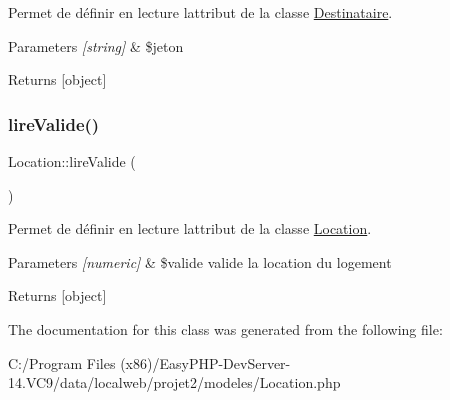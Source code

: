 Permet de définir en lecture l\textquotesingle{}attribut de la classe \hyperlink{class_destinataire}{Destinataire}. 


\begin{DoxyParams}{Parameters}
{\em \mbox{[}string\mbox{]}} & \$jeton \\
\hline
\end{DoxyParams}
\begin{DoxyReturn}{Returns}
\mbox{[}object\mbox{]} 
\end{DoxyReturn}
\mbox{\label{class_location_a3968f27d68529387d6e3b1de5bc871a4}} 
\subsubsection{\texorpdfstring{lire\+Valide()}{lireValide()}}
{\footnotesize\ttfamily Location\+::lire\+Valide (\begin{DoxyParamCaption}{ }\end{DoxyParamCaption})}



Permet de définir en lecture l\textquotesingle{}attribut de la classe \hyperlink{class_location}{Location}. 


\begin{DoxyParams}{Parameters}
{\em \mbox{[}numeric\mbox{]}} & \$valide valide la location du logement \\
\hline
\end{DoxyParams}
\begin{DoxyReturn}{Returns}
\mbox{[}object\mbox{]} 
\end{DoxyReturn}


The documentation for this class was generated from the following file\+:\begin{DoxyCompactItemize}
\item 
C\+:/\+Program Files (x86)/\+Easy\+P\+H\+P-\/\+Dev\+Server-\/14.\+V\+C9/data/localweb/projet2/modeles/Location.\+php\end{DoxyCompactItemize}
